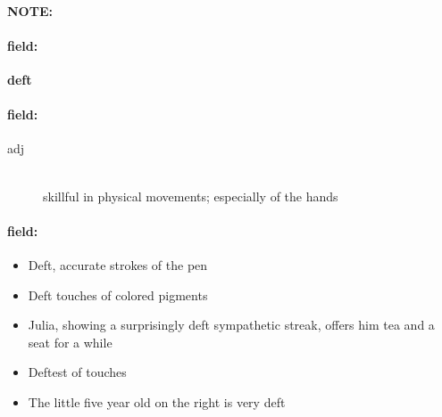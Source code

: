 \documentclass[12pt]{article}
\newenvironment{note}{\paragraph{NOTE:}}{}
\newenvironment{field}{\paragraph{field:}}{}
\begin{document}
\begin{note}
\begin{field}
\textbf{\large deft}
\end{field}


\begin{field}
\begin{description}
\item[adj] \hfill \\ 
skillful in physical movements; especially of the hands

\end{description}
\end{field}

\begin{field}
\begin{itemize}
\item Deft, accurate strokes of the pen
\item Deft touches of colored pigments
\item Julia, showing a surprisingly deft sympathetic streak, offers him tea and a seat for a while
\item Deftest of touches
\item The little five year old on the right is very deft
\end{itemize}
\end{field}
\end{note}
\end{document}
